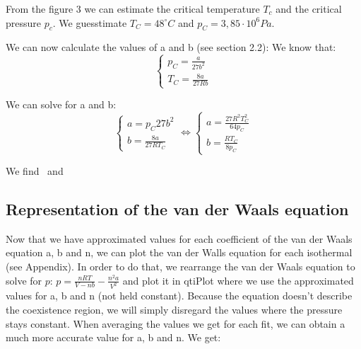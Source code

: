 \documentclass{scrartcl}
\begin{document}
\newpage

From the figure 3 we can estimate the critical temperature $T_c$ and the critical pressure $p_c$. We guesstimate $\boxed{T_C = 48^{\circ}C}$ and $\boxed{p_C = 3,85 \cdot 10^6 Pa}$.

We can now calculate the values of a and b (see section 2.2):
We know that:
\begin{equation} \nonumber
    \begin{cases}
    p_C = \frac{a}{27b^2} \\
    T_C = \frac{8a}{27Rb}
    \end{cases}
\end{equation}

We can solve for a and b:
\begin{equation} \nonumber
    \begin{cases}
    a = p_C27b^2 \\
    b = \frac{8a}{27RT_C}
    \end{cases}
    \Leftrightarrow
    \begin{cases}
        a = \frac{27R^2T_C^2}{64p_C} \\
        b = \frac{RT_C}{8p_C}
    \end{cases}
\end{equation}

We find  \ and \  

\subsection{Representation of the van der Waals equation}

Now that we have approximated values for each coefficient of the van der Waals equation a, b and n, we can plot the van der Walls equation for each isothermal (see Appendix). In order to do that, we rearrange the van der Waals equation to solve for $p$: $p =  \frac{nRT}{V-nb}-\frac{n^2a}{V^2}$ and plot it in qtiPlot where we use the approximated values for a, b and n (not held constant).
Because the equation doesn't describe the coexistence region, we will simply disregard the values where the pressure stays constant. When averaging the values we get for each fit, we can obtain a much more accurate value for a, b and n. We get:
\end{document}
